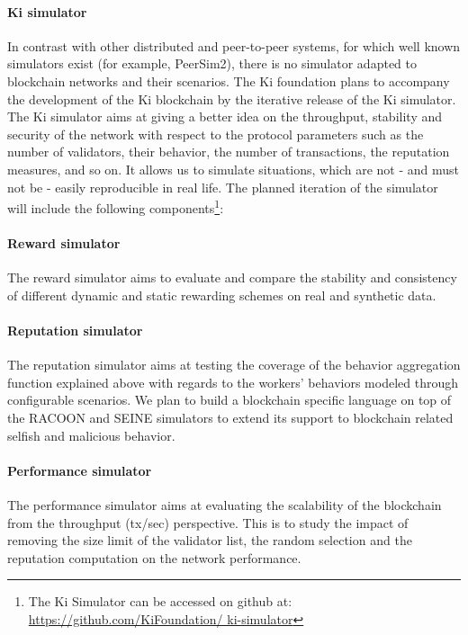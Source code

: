 \paragraph{Ki simulator} In contrast with other distributed and peer-to-peer systems, for which well known simulators exist (for example, PeerSim2), there is no simulator adapted to blockchain networks and their scenarios. The Ki foundation plans to accompany the development of the Ki blockchain by the iterative release of the Ki simulator. The Ki simulator aims at giving a better idea on the throughput, stability and security of the network with respect to the protocol parameters such as the number of validators, their behavior, the number of transactions, the reputation measures, and so on. It allows us to simulate situations, which are not - and must not be - easily reproducible in real life. The planned iteration of the simulator will include the following components\footnote{The Ki Simulator can be accessed on github at: \url{https://github.com/KiFoundation/ ki-simulator}}:
					
\paragraph{Reward simulator} The reward simulator aims to evaluate and compare the stability and consistency of different dynamic and static rewarding schemes on real and synthetic data.
					
\paragraph{Reputation simulator} The reputation simulator aims at testing the coverage of the behavior aggregation function explained above with regards to the workers' behaviors modeled through configurable scenarios. We plan to build a blockchain specific language on top of the RACOON\cite{lenacota2015} and SEINE simulators\cite{cota2017analysing} to extend its support to blockchain related selfish and malicious behavior.
					
\paragraph{Performance simulator} The performance simulator aims at evaluating the scalability of the blockchain from the throughput (tx/sec) perspective. This is to study the impact of removing the size limit of the validator list, the random selection and the reputation computation on the network performance.\\
					
